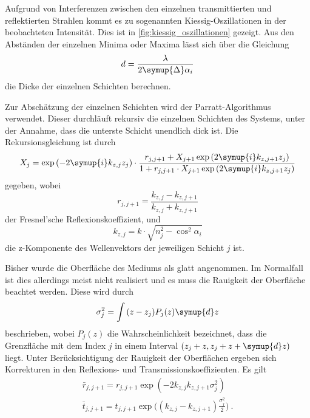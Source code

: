 Aufgrund von Interferenzen zwischen den einzelnen transmittierten und reflektierten Strahlen kommt es zu sogenannten Kiessig-Oszillationen \cite{kiessig} in der beobachteten Intensität.
Dies ist in \autoref{fig:kiessig_oszillationen} gezeigt.
Aus den Abständen der einzelnen Minima oder Maxima lässt sich über die Gleichung
\begin{equation}
    d = \frac{\lambda}{2 \symup{\Delta} \alpha_i}
    \label{eqn:schichtdicke_kiessig}
\end{equation}
die Dicke der einzelnen Schichten berechnen.

Zur Abschätzung der einzelnen Schichten wird der Parratt-Algorithmus \cite{parratt} verwendet.
Dieser durchläuft rekursiv die einzelnen Schichten des Systems,
unter der Annahme,
dass die unterste Schicht unendlich dick ist.
Die Rekursionsgleichung ist durch
\begin{equation}
    X_{j} = \exp{(-2\symup{i} k_{z, j} z_{j})} \cdot
    \frac{r_{j, j+1} + X_{j+1} \exp{(2\symup{i} k_{z, j+1} z_{j})}}
    {1 + r_{j, j+1} \cdot X_{j+1} \exp{(2\symup{i} k_{z, j+1} z_{j})}}
\end{equation}
gegeben,
wobei
\begin{equation}
    r_{j, j+1} = \frac{k_{z, j} - k_{z, j+1}}{k_{z, j} + k_{z, j+1}}
\end{equation}
der Fresnel'sche Reflexionskoeffizient,
und
\begin{equation}
    k_{z, j} = k \cdot \sqrt{n^2_j - \cos^2{\alpha_i}}
\end{equation}
die z-Komponente des Wellenvektors der jeweiligen Schicht $j$ ist.

Bisher wurde die Oberfläche des Mediums als glatt angenommen.
Im Normalfall ist dies allerdings meist nicht realisiert und es muss die Rauigkeit der Oberfläche beachtet werden.
Diese wird durch
\begin{equation}
    \sigma^2_j = \int{(z-z_j) P_j(z) \symup{d}z}
\end{equation}
beschrieben,
wobei $P_j(z)$ die Wahrscheinlichkeit bezeichnet,
dass die Grenzfläche mit dem Index $j$ in einem Interval $(z_j + z, z_j + z + \symup{d}z)$ liegt.
Unter Berücksichtigung der Rauigkeit der Oberflächen ergeben sich Korrekturen in den Reflexions- und Transmissionskoeffizienten.
Es gilt
\begin{gather}
    \bar{r}_{j, j+1} = r_{j, j+1} \exp{(-2 k_{z, j} k_{z, j+1} \sigma^2_{j})} \\
    \bar{t}_{j, j+1} = t_{j, j+1} \exp{\biggl((k_{z, j} - k_{z, j+1}) \frac{\sigma^2_{j}}{2}\biggr)} \ .
\end{gather}
